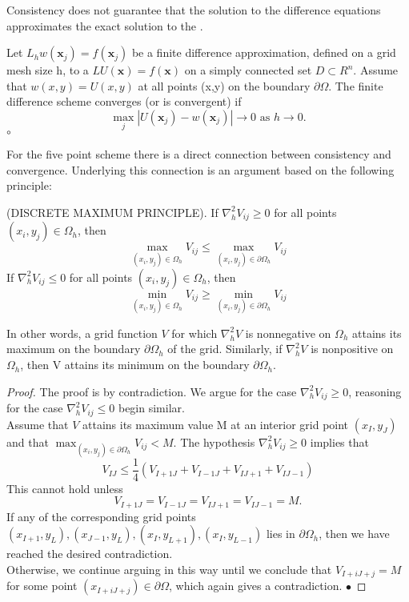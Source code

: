 Consistency does not guarantee that the solution to the difference equations approximates the exact solution to the . 
\begin{definition}
Let $L_hw(\mathbf{x}_j)=f(\mathbf{x}_j)$ be a finite difference approximation, defined on a grid mesh size h, to a  $LU(\mathbf{x})=f(\mathbf{x})$ on a simply
connected set $D \subset R^n$. Assume that $w(x,y)=U(x,y)$ at all points (x,y) on the boundary $\partial\Omega$.  The finite difference scheme converges (or is convergent) if
\[ \max_j|U(\mathbf{x}_j)-w(\mathbf{x}_j)| \rightarrow 0 \mbox{  as  } h \rightarrow 0.\]
$\circ$
\end{definition}
For the five point scheme there is a direct connection between consistency and convergence.  Underlying this connection is an argument based on the following principle:
\begin{theorem}
(DISCRETE MAXIMUM PRINCIPLE).
If $\nabla^2_hV_{ij}\geq 0$ for all points $(x_i,y_j) \in \Omega_h$, then
\[ \max_{(x_i,y_j)\in\Omega_h}V_{ij}\leq  \max_{(x_i,y_j)\in\partial\Omega_h}V_{ij}\]
If $\nabla^2_hV_{ij}\leq 0$ for all points $(x_i,y_j) \in \Omega_h$, then
\[ \min_{(x_i,y_j)\in\Omega_h}V_{ij}\geq  \min_{(x_i,y_j)\in\partial\Omega_h}V_{ij}\]
\end{theorem}
In other words, a grid function $V$ for which $\nabla^2_hV$ is nonnegative on $\Omega_h$ attains its maximum on the boundary $\partial\Omega_h$ of the grid.  Similarly, if $\nabla^2_hV$ is nonpositive on $\Omega_h$, then V attains its minimum on the boundary $\partial\Omega_h$.
\begin{proof}
The proof is by contradiction.  We argue for the case $\nabla_h^2V_{ij} \geq 0$, reasoning for the case $\nabla_h^2V_{ij}\leq 0$ begin similar.\\
Assume that $V$ attains its maximum value M at an interior grid point $(x_I,y_J)$ and that $\max_{(x_i,y_j)\in\partial\Omega_h}V_{ij}<M.$ The hypothesis $\nabla_{h}^2V_{ij} \geq 0$ implies that
\[ V_{IJ}\leq\frac{1}{4}(V_{I+1J}+V_{I-1J}+V_{IJ+1}+V_{IJ-1}) \]
This cannot hold unless
\[ V_{I+1J}=V_{I-1J}=V_{IJ+1}=V_{IJ-1}=M. \]
If any of the corresponding grid points $(x_{I+1},y_{L}),(x_{J-1},y_{L}),(x_{I},y_{L+1}),(x_{I},y_{L-1})$ lies in $\partial\Omega_h$, then we have reached the 
desired contradiction.\\
Otherwise, we continue arguing in this way until we conclude that $V_{I+iJ+j}=M$
for some point $(x_{I+iJ+j})\in \partial\Omega$, which again gives a contradiction.
$\bullet$\end{proof}
